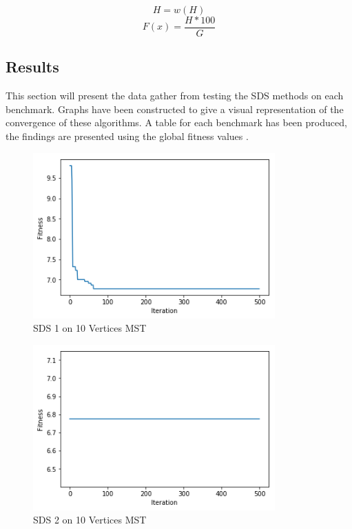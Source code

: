 \documentclass{AISB2008}
\begin{document}
{\begin{equation}
H = w(H)
\end{equation}
\begin{equation}
F(x) = \frac{H * 100}{G}
\end{equation}


\subsection{Results}

This section will present the data gather from testing the SDS methods on each benchmark. Graphs have been constructed to give a visual representation of the convergence of these algorithms. A table for each benchmark has been produced, the findings are presented using the global fitness values .

\begin{figure}
\centerline{\includegraphics[height=2.5in]{10MSTA1.png}}
\caption{SDS 1 on 10 Vertices MST}
\end{figure}

\begin{figure}
\centerline{\includegraphics[height=2.5in]{10MSTA2.png}}
\caption{SDS 2 on 10 Vertices MST}
\end{figure}

}
\end{document}
